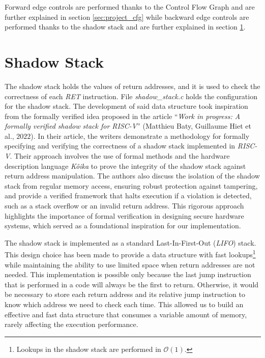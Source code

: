 Forward edge controls are performed thanks to the Control Flow Graph and are
further explained in section \ref{sec:project_cfg} while backward edge controls
are performed thanks to the shadow stack and are further explained in section
\ref{sec:project_ss}.

\section{Shadow Stack}
\label{sec:project_ss}

The shadow stack holds the values of return addresses, and it is used to check
the correctness of each \textit{RET} instruction. File \textit{shadow\_stack.c} holds
the configuration for the shadow stack. The development of said data structure
took inspiration from the formally verified idea proposed in the article ``\textit{Work
in progress: A formally verified shadow stack for RISC-V}'' (Matthieu Baty, Guillaume
Hiet et al., $2022$)\cite{shadowstack}. In their article, the writers demonstrate
a methodology for formally specifying and verifying the correctness of a shadow stack
implemented in \textit{RISC-V}. Their approach involves the use of formal methods
and the hardware description language \textit{Kôika}\cite{koika} to prove the integrity
of the shadow stack against return address manipulation. The authors also
discuss the isolation of the shadow stack from regular memory access, ensuring robust
protection against tampering, and provide a verified framework that halts
execution if a violation is detected, such as a stack overflow or an invalid return
address. This rigorous approach highlights the importance of formal verification
in designing secure hardware systems, which served as a foundational inspiration
for our implementation.

The shadow stack is implemented as a standard Last-In-First-Out (\textit{LIFO})
stack. This design choice has been made to provide a data structure with fast lookups\footnote{Lookups
in the shadow stack are performed in $\mathcal{O}(1)$.} while maintaining the
ability to use limited space when return addresses are not needed. This implementation
is possible only because the last jump instruction that is performed in a code will
always be the first to return. Otherwise, it would be necessary to store each return
address and its relative jump instruction to know which address we need to check
each time. This allowed us to build an effective and fast data structure that
consumes a variable amount of memory, rarely affecting the execution performance.

